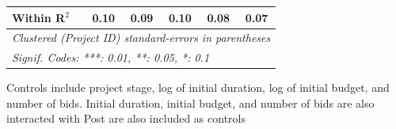 \documentclass[
]{article}
\begin{document}
\begin{table}[htbp]
\begin{tabular}{lccccc}
      Within R$^2$                 & 0.10                                                                                          & 0.09                                          & 0.10                                        & 0.08                                                           & 0.07\\  
      \midrule
      \multicolumn{6}{l}{\emph{Clustered (Project ID) standard-errors in parentheses}}\\
      \multicolumn{6}{l}{\emph{Signif. Codes: ***: 0.01, **: 0.05, *: 0.1}}\\
   \end{tabular}
   
   \par \raggedright 
   Controls include project stage, log of initial duration, log of initial budget, and number of bids. Initial duration, initial budget, and number of bids are also interacted with Post are also included as controls
\end{table}
\end{document}
